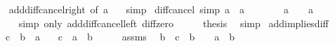 \begin{isabellebody}
%
\isadelimproof
\ \ %
\endisadelimproof
%
\isatagproof
{}\isamarkupfalse%
\ add{\isacharunderscore}{\kern0pt}diff{\isacharunderscore}{\kern0pt}cancel{\isacharunderscore}{\kern0pt}right{\isacharprime}{\kern0pt}\ {\isacharbrackleft}{\kern0pt}of\ a\ {}{\isacharbrackright}{\kern0pt}\ \isamarkupfalse%
\ simp%
\endisatagproof
{\isafoldproof}%
%
\isadelimproof
\isanewline
%
\endisadelimproof
\isanewline
{}\isamarkupfalse%
\ diff{\isacharunderscore}{\kern0pt}cancel\ {\isacharbrackleft}{\kern0pt}simp{\isacharbrackright}{\kern0pt}{\isacharcolon}{\kern0pt}\ {\isachardoublequoteopen}a\ {\isacharminus}{\kern0pt}\ a\ {\isacharequal}{\kern0pt}\ {}{\isachardoublequoteclose}\isanewline
%
\isadelimproof
%
\endisadelimproof
%
\isatagproof
{}\isamarkupfalse%
\ {\isacharminus}{\kern0pt}\isanewline
\ \ \isamarkupfalse%
\ {\isachardoublequoteopen}{\isacharparenleft}{\kern0pt}a\ {\isacharplus}{\kern0pt}\ {}{\isacharparenright}{\kern0pt}\ {\isacharminus}{\kern0pt}\ {\isacharparenleft}{\kern0pt}a\ {\isacharplus}{\kern0pt}\ {}{\isacharparenright}{\kern0pt}\ {\isacharequal}{\kern0pt}\ {}{\isachardoublequoteclose}\isanewline
\ \ \ \ \isamarkupfalse%
\ {\isacharparenleft}{\kern0pt}simp\ only{\isacharcolon}{\kern0pt}\ add{\isacharunderscore}{\kern0pt}diff{\isacharunderscore}{\kern0pt}cancel{\isacharunderscore}{\kern0pt}left\ diff{\isacharunderscore}{\kern0pt}zero{\isacharparenright}{\kern0pt}\isanewline
\ \ \isamarkupfalse%
\ \isamarkupfalse%
\ {\isacharquery}{\kern0pt}thesis\ \isamarkupfalse%
\ simp\isanewline
{}\isamarkupfalse%
%
\endisatagproof
{\isafoldproof}%
%
\isadelimproof
\isanewline
%
\endisadelimproof
\isanewline
{}\isamarkupfalse%
\ add{\isacharunderscore}{\kern0pt}implies{\isacharunderscore}{\kern0pt}diff{\isacharcolon}{\kern0pt}\isanewline
\ \ \ {\isachardoublequoteopen}c\ {\isacharplus}{\kern0pt}\ b\ {\isacharequal}{\kern0pt}\ a{\isachardoublequoteclose}\isanewline
\ \ \ {\isachardoublequoteopen}c\ {\isacharequal}{\kern0pt}\ a\ {\isacharminus}{\kern0pt}\ b{\isachardoublequoteclose}\isanewline
%
\isadelimproof
%
\endisadelimproof
%
\isatagproof
{}\isamarkupfalse%
\ {\isacharminus}{\kern0pt}\isanewline
\ \ \isamarkupfalse%
\ assms\ \isamarkupfalse%
\ {\isachardoublequoteopen}{\isacharparenleft}{\kern0pt}b\ {\isacharplus}{\kern0pt}\ c{\isacharparenright}{\kern0pt}\ {\isacharminus}{\kern0pt}\ {\isacharparenleft}{\kern0pt}b\ {\isacharplus}{\kern0pt}\ {}{\isacharparenright}{\kern0pt}\ {\isacharequal}{\kern0pt}\ a\ {\isacharminus}{\kern0pt}\ b{\isachardoublequoteclose}\isanewline

\end{isabellebody}

